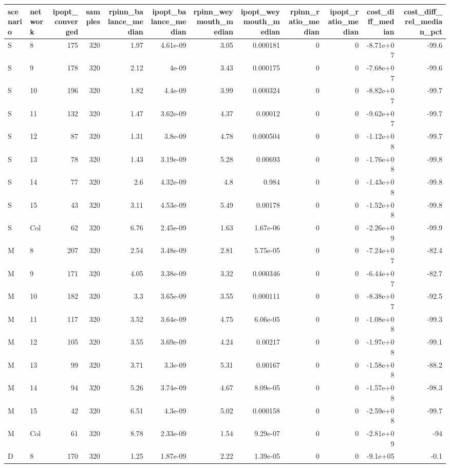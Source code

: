 \begin{tabular}{llrrrrrrrrrr}
\toprule
scenario & network & ipopt_converged & samples & rpinn_balance_median & ipopt_balance_median & rpinn_weymouth_median & ipopt_weymouth_median & rpinn_ratio_median & ipopt_ratio_median & cost_diff_median & cost_diff_rel_median_pct \\
\midrule
S & 8 & 175 & 320 & 1.97 & 4.61e-09 & 3.05 & 0.000181 & 0 & 0 & -8.71e+07 & -99.6 \\
S & 9 & 178 & 320 & 2.12 & 4e-09 & 3.43 & 0.000175 & 0 & 0 & -7.68e+07 & -99.6 \\
S & 10 & 196 & 320 & 1.82 & 4.4e-09 & 3.99 & 0.000324 & 0 & 0 & -8.82e+07 & -99.7 \\
S & 11 & 132 & 320 & 1.47 & 3.62e-09 & 4.37 & 0.00012 & 0 & 0 & -9.62e+07 & -99.7 \\
S & 12 & 87 & 320 & 1.31 & 3.8e-09 & 4.78 & 0.000504 & 0 & 0 & -1.12e+08 & -99.7 \\
S & 13 & 78 & 320 & 1.43 & 3.19e-09 & 5.28 & 0.00693 & 0 & 0 & -1.76e+08 & -99.8 \\
S & 14 & 77 & 320 & 2.6 & 4.32e-09 & 4.8 & 0.984 & 0 & 0 & -1.43e+08 & -99.8 \\
S & 15 & 43 & 320 & 3.11 & 4.53e-09 & 5.49 & 0.00178 & 0 & 0 & -1.52e+08 & -99.8 \\
S & Col & 62 & 320 & 6.76 & 2.45e-09 & 1.63 & 1.67e-06 & 0 & 0 & -2.26e+09 & -99.9 \\
M & 8 & 207 & 320 & 2.54 & 3.48e-09 & 2.81 & 5.75e-05 & 0 & 0 & -7.24e+07 & -82.4 \\
M & 9 & 171 & 320 & 4.05 & 3.38e-09 & 3.32 & 0.000346 & 0 & 0 & -6.44e+07 & -82.7 \\
M & 10 & 182 & 320 & 3.3 & 3.65e-09 & 3.55 & 0.000111 & 0 & 0 & -8.38e+07 & -92.5 \\
M & 11 & 117 & 320 & 3.52 & 3.64e-09 & 4.75 & 6.06e-05 & 0 & 0 & -1.08e+08 & -99.3 \\
M & 12 & 105 & 320 & 3.55 & 3.69e-09 & 4.24 & 0.00217 & 0 & 0 & -1.97e+08 & -99.1 \\
M & 13 & 99 & 320 & 3.71 & 3.3e-09 & 5.31 & 0.00167 & 0 & 0 & -1.58e+08 & -88.2 \\
M & 14 & 94 & 320 & 5.26 & 3.74e-09 & 4.67 & 8.09e-05 & 0 & 0 & -1.57e+08 & -98.3 \\
M & 15 & 42 & 320 & 6.51 & 4.3e-09 & 5.02 & 0.000158 & 0 & 0 & -2.59e+08 & -99.7 \\
M & Col & 61 & 320 & 8.78 & 2.33e-09 & 1.54 & 9.29e-07 & 0 & 0 & -2.81e+09 & -94 \\
D & 8 & 170 & 320 & 1.25 & 1.87e-09 & 2.22 & 1.39e-05 & 0 & 0 & -9.1e+05 & -0.1 \\

\end{tabular}
